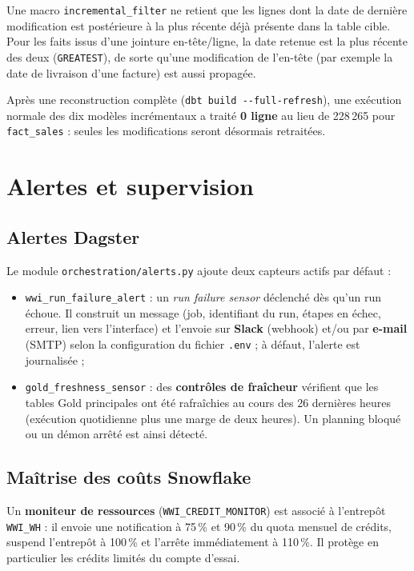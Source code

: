 Une macro \texttt{incremental\_filter} ne retient que les lignes dont la date de dernière modification
est postérieure à la plus récente déjà présente dans la table cible. Pour les faits issus d'une jointure
en-tête/ligne, la date retenue est la plus récente des deux (\texttt{GREATEST}), de sorte qu'une
modification de l'en-tête (par exemple la date de livraison d'une facture) est aussi propagée.

\begin{resultbox}[title=Vérification]
Après une reconstruction complète (\texttt{dbt build -{}-full-refresh}), une exécution normale des dix
modèles incrémentaux a traité \textbf{0 ligne} au lieu de 228\,265 pour \texttt{fact\_sales} : seules les
modifications seront désormais retraitées.
\end{resultbox}

\section{Alertes et supervision}

\subsection{Alertes Dagster}
Le module \texttt{orchestration/alerts.py} ajoute deux capteurs actifs par défaut :
\begin{itemize}
  \item \texttt{wwi\_run\_failure\_alert} : un \emph{run failure sensor} déclenché dès qu'un run échoue.
        Il construit un message (job, identifiant du run, étapes en échec, erreur, lien vers
        l'interface) et l'envoie sur \textbf{Slack} (webhook) et/ou par \textbf{e-mail} (SMTP) selon
        la configuration du fichier \texttt{.env} ; à défaut, l'alerte est journalisée ;
  \item \texttt{gold\_freshness\_sensor} : des \textbf{contrôles de fraîcheur} vérifient que les tables
        Gold principales ont été rafraîchies au cours des 26 dernières heures (exécution quotidienne
        plus une marge de deux heures). Un planning bloqué ou un démon arrêté est ainsi détecté.
\end{itemize}

\subsection{Maîtrise des coûts Snowflake}
Un \textbf{moniteur de ressources} (\texttt{WWI\_CREDIT\_MONITOR}) est associé à l'entrepôt
\texttt{WWI\_WH} : il envoie une notification à 75\,\% et 90\,\% du quota mensuel de crédits, suspend
l'entrepôt à 100\,\% et l'arrête immédiatement à 110\,\%. Il protège en particulier les crédits limités
du compte d'essai.

